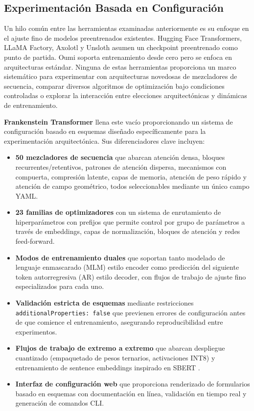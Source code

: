 \subsection{Experimentación Basada en Configuración}

Un hilo común entre las herramientas examinadas anteriormente es su enfoque en el ajuste fino de modelos preentrenados existentes. Hugging Face Transformers, LLaMA Factory, Axolotl y Unsloth asumen un checkpoint preentrenado como punto de partida. Oumi soporta entrenamiento desde cero pero se enfoca en arquitecturas estándar. Ninguna de estas herramientas proporciona un marco sistemático para experimentar con arquitecturas novedosas de mezcladores de secuencia, comparar diversos algoritmos de optimización bajo condiciones controladas o explorar la interacción entre elecciones arquitectónicas y dinámicas de entrenamiento.

\textbf{Frankenstein Transformer} llena este vacío proporcionando un sistema de configuración basado en esquemas diseñado específicamente para la experimentación arquitectónica. Sus diferenciadores clave incluyen:

\begin{itemize}[leftmargin=*]
    \item \textbf{50 mezcladores de secuencia} que abarcan atención densa, bloques recurrentes/retentivos, patrones de atención dispersa, mecanismos con compuerta, compresión latente, capas de memoria, atención de peso rápido y atención de campo geométrico, todos seleccionables mediante un único campo YAML.
    \item \textbf{23 familias de optimizadores} con un sistema de enrutamiento de hiperparámetros con prefijos que permite control por grupo de parámetros a través de embeddings, capas de normalización, bloques de atención y redes feed-forward.
    \item \textbf{Modos de entrenamiento duales} que soportan tanto modelado de lenguaje enmascarado (MLM) estilo encoder como predicción del siguiente token autorregresiva (AR) estilo decoder, con flujos de trabajo de ajuste fino especializados para cada uno.
    \item \textbf{Validación estricta de esquemas} mediante restricciones \texttt{additionalProperties: false} que previenen errores de configuración antes de que comience el entrenamiento, asegurando reproducibilidad entre experimentos.
    \item \textbf{Flujos de trabajo de extremo a extremo} que abarcan despliegue cuantizado (empaquetado de pesos ternarios, activaciones INT8) y entrenamiento de sentence embeddings inspirado en SBERT \citep{reimers_sentence-bert_2019}.
    \item \textbf{Interfaz de configuración web} que proporciona renderizado de formularios basado en esquemas con documentación en línea, validación en tiempo real y generación de comandos CLI.
\end{itemize}

